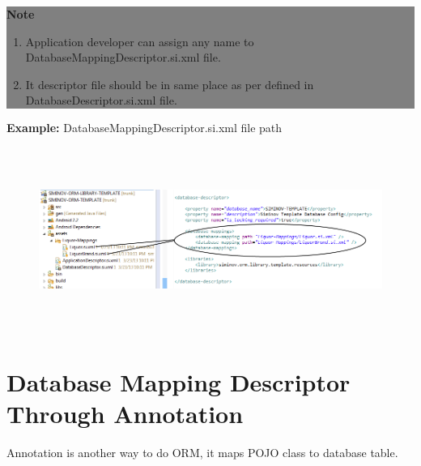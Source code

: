 \newpage
\begin{center}
		\colorbox{grey}{
			\parbox[t]{.8\linewidth}{
				\fontsize{11pt}{11pt}\selectfont %
				\vspace*{0.1cm} %
		
				\hfill \textbf{Note} \\

				\hfill 

				\begin{enumerate}

					\item \small Application developer can assign any name to DatabaseMappingDescriptor.si.xml file.

					\item \small It descriptor file should be in same place as per defined in DatabaseDescriptor.si.xml file.
	
				\end{enumerate}

				\vspace*{0.0cm} %
			}
		}

\end{center}

		\par
		\textbf{Example:} DatabaseMappingDescriptor.si.xml file path
		\begin{figure}[htbp]
			\centering
				\includegraphics[height=6cm]{Resources/siminov_template_database_descriptor_mapping_path_example.png}
		\end{figure}


\newpage
\section{Database Mapping Descriptor Through Annotation}
Annotation is another way to do ORM, it maps POJO class to database table.

